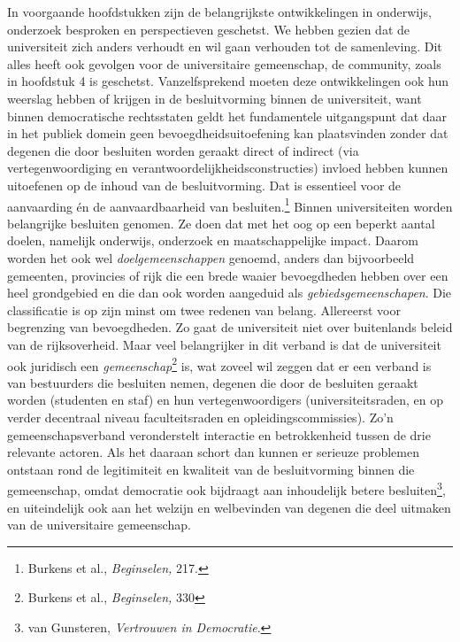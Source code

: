 \documentclass[smallauthor, chapterhaspagenum, nochapterinheader, pagenuminheader,  bigchapnum,medium2, tocpages, garamond, titleinheader]{jote-book}
\begin{document}
	In voorgaande hoofdstukken zijn de belangrijkste ontwikkelingen in onderwijs, onderzoek besproken en perspectieven geschetst. We hebben gezien dat de universiteit zich anders verhoudt en wil gaan verhouden tot de samenleving. Dit alles heeft ook gevolgen voor de universitaire gemeenschap, de community, zoals in hoofdstuk 4 is geschetst. Vanzelfsprekend moeten deze ontwikkelingen ook hun weerslag hebben of krijgen in de besluitvorming binnen de universiteit, want binnen democratische rechtsstaten geldt het fundamentele uitgangspunt dat daar in het publiek domein geen bevoegdheidsuitoefening kan plaatsvinden zonder dat degenen die door besluiten worden geraakt direct of indirect (via vertegenwoordiging en verantwoordelijkheidsconstructies) invloed hebben kunnen uitoefenen op de inhoud van de besluitvorming. Dat is essentieel voor de aanvaarding én de aanvaardbaarheid van besluiten.\footnote{Burkens et al., \emph{Beginselen}\emph{, }217.} Binnen universiteiten worden belangrijke besluiten genomen. Ze doen dat met het oog op een beperkt aantal doelen, namelijk onderwijs, onderzoek en maatschappelijke impact. Daarom worden het ook wel \emph{doelgemeenschappen} genoemd, anders dan bijvoorbeeld gemeenten, provincies of rijk die een brede waaier bevoegdheden hebben over een heel grondgebied en die dan ook worden aangeduid als \emph{gebiedsgemeenschapen}. Die classificatie is op zijn minst om twee redenen van belang. Allereerst voor begrenzing van bevoegdheden. Zo gaat de universiteit niet over buitenlands beleid van de rijksoverheid. Maar veel belangrijker in dit verband is dat de universiteit ook juridisch een \emph{gemeenschap}\footnote{Burkens et al., \emph{Beginsele}\emph{n}\emph{,}\emph{ }330}\emph{ }is, wat zoveel wil zeggen dat er een verband is van bestuurders die besluiten nemen, degenen die door de besluiten geraakt worden (studenten en staf) en hun vertegenwoordigers (universiteitsraden, en op verder decentraal niveau faculteitsraden en opleidingscommissies). Zo'n gemeenschapsverband veronderstelt interactie en betrokkenheid tussen de drie relevante actoren. Als het daaraan schort dan kunnen er serieuze problemen ontstaan rond de legitimiteit en kwaliteit van de besluitvorming binnen die gemeenschap, omdat democratie ook bijdraagt aan inhoudelijk betere besluiten\footnote{van Gunsteren, \emph{Vertrouwen in Democratie}.}, en uiteindelijk ook aan het welzijn en welbevinden van degenen die deel uitmaken van de universitaire gemeenschap.
\end{document}
